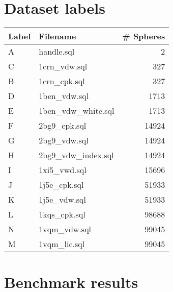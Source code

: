 \section{Dataset labels}
\label{app:labels}
\begin{tabular}{|l|l|r|}
\hline
Label  & Filename & \# Spheres \\
\hline
\hline
A &	handle.sql & 2 \\
\hline
C &	1crn\_vdw.sql & 327 \\
\hline
B &	1crn\_cpk.sql & 327 \\
\hline
D &	1ben\_vdw.sql & 1713 \\
\hline
E &	1ben\_vdw\_white.sql & 1713 \\
\hline
F &	2bg9\_cpk.sql & 14924 \\
\hline
G &	2bg9\_vdw.sql & 14924 \\
\hline
H & 2bg9\_vdw\_index.sql & 14924 \\
\hline
I &	1xi5\_vwd.sql & 15696 \\
\hline
J & 1j5e\_cpk.sql & 51933 \\
\hline
K &	1j5e\_vdw.sql & 51933 \\
\hline
L &	1kqs\_cpk.sql & 98688 \\
\hline
N & 1vqm\_vdw.sql & 99045 \\
\hline
M & 1vqm\_lic.sql & 99045 \\
\hline
\end{tabular}

\newpage
\section{Benchmark results}

